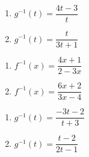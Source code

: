 \begin{multicols}{2}
\begin{enumerate}
\setcounter{enumi}{\value{HW}}

\item $g^{-1}(t) = \dfrac{4t-3}{t}$
\item $g^{-1}(t) = \dfrac{t}{3t+1}$

\setcounter{HW}{\value{enumi}}
\end{enumerate}
\end{multicols}

\begin{multicols}{2}
\begin{enumerate}
\setcounter{enumi}{\value{HW}}

\item $f^{-1}(x) = \dfrac{4x+1}{2-3x}$
\item $f^{-1}(x) = \dfrac{6x + 2}{3x - 4}$

\setcounter{HW}{\value{enumi}}
\end{enumerate}
\end{multicols}

\begin{multicols}{2}
\begin{enumerate}
\setcounter{enumi}{\value{HW}}

\item $g^{-1}(t) = \dfrac{-3t - 2}{t + 3}$
\item $g^{-1}(t) = \dfrac{t-2}{2t-1}$ 

\setcounter{HW}{\value{enumi}}
\end{enumerate}
\end{multicols}

